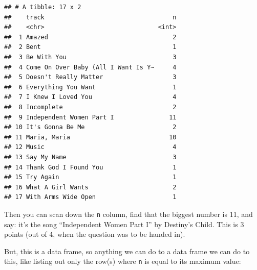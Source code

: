 \documentclass[]{tufte-book}
\newenvironment{Shaded}{}{}
\newcommand{\DataTypeTok}[1]{\textcolor[rgb]{0.56,0.13,0.00}{#1}}
\newcommand{\DecValTok}[1]{\textcolor[rgb]{0.25,0.63,0.44}{#1}}
\newcommand{\KeywordTok}[1]{\textcolor[rgb]{0.00,0.44,0.13}{\textbf{#1}}}
\newcommand{\NormalTok}[1]{#1}
\newcommand{\OperatorTok}[1]{\textcolor[rgb]{0.40,0.40,0.40}{#1}}
\newcommand{\StringTok}[1]{\textcolor[rgb]{0.25,0.44,0.63}{#1}}
\theoremstyle{definition}
\theoremstyle{definition}
\theoremstyle{definition}
\theoremstyle{remark}
\begin{document}
\begin{verbatim}
## # A tibble: 17 x 2
##    track                                   n
##    <chr>                               <int>
##  1 Amazed                                  2
##  2 Bent                                    1
##  3 Be With You                             3
##  4 Come On Over Baby (All I Want Is Y~     4
##  5 Doesn't Really Matter                   3
##  6 Everything You Want                     1
##  7 I Knew I Loved You                      4
##  8 Incomplete                              2
##  9 Independent Women Part I               11
## 10 It's Gonna Be Me                        2
## 11 Maria, Maria                           10
## 12 Music                                   4
## 13 Say My Name                             3
## 14 Thank God I Found You                   1
## 15 Try Again                               1
## 16 What A Girl Wants                       2
## 17 With Arms Wide Open                     1
\end{verbatim}

Then you can scan down the \texttt{n} column, find that the biggest
number is 11, and say: it's the song ``Independent Women Part I'' by
Destiny's Child. This is 3 points (out of 4, when the question was to be
handed in).

But, this is a data frame, so anything we can do to a data frame we can
do to this, like listing out only the row(s) where \texttt{n} is equal
to its maximum value:

\begin{Shaded}
\end{Shaded}
\end{document}
